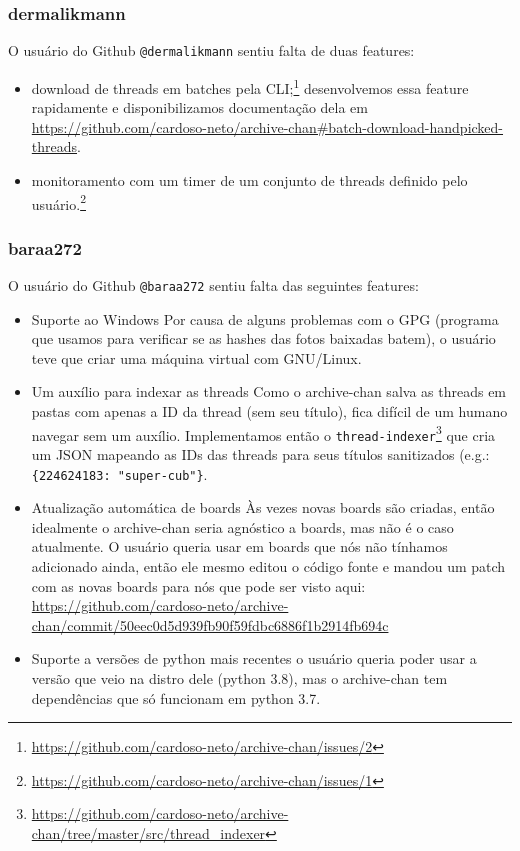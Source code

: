 \subsubsection{dermalikmann}

O usuário do Github \texttt{@dermalikmann} sentiu falta de duas features:

\begin{itemize}
    \item download de threads em batches pela CLI;\footnote{\url{https://github.com/cardoso-neto/archive-chan/issues/2}}
        \subitem desenvolvemos essa feature rapidamente e disponibilizamos documentação dela em \url{https://github.com/cardoso-neto/archive-chan#batch-download-handpicked-threads}.
    \item monitoramento com um timer de um conjunto de threads definido pelo usuário.\footnote{\url{https://github.com/cardoso-neto/archive-chan/issues/1}}
\end{itemize} 

\subsubsection{baraa272}

O usuário do Github \texttt{@baraa272} sentiu falta das seguintes features:

\begin{itemize}
    \item Suporte ao Windows
        \subitem Por causa de alguns problemas com o GPG (programa que usamos para verificar se as hashes das fotos baixadas batem), o usuário teve que criar uma máquina virtual com GNU/Linux.
    \item Um auxílio para indexar as threads
        \subitem Como o archive-chan salva as threads em pastas com apenas a ID da thread (sem seu título), fica difícil de um humano navegar sem um auxílio.
        \subitem Implementamos então o \texttt{thread-indexer}\footnote{\url{https://github.com/cardoso-neto/archive-chan/tree/master/src/thread_indexer}} que cria um JSON mapeando as IDs das threads para seus títulos sanitizados (e.g.: \texttt{\{224624183: "super-cub"\}}.
    \item Atualização automática de boards
        \subitem Às vezes novas boards são criadas, então idealmente o archive-chan seria agnóstico a boards, mas não é o caso atualmente.
        \subitem O usuário queria usar em boards que nós não tínhamos adicionado ainda, então ele mesmo editou o código fonte e mandou um patch com as novas boards para nós que pode ser visto aqui: \url{https://github.com/cardoso-neto/archive-chan/commit/50eec0d5d939fb90f59fdbc6886f1b2914fb694c}
    \item Suporte a versões de python mais recentes
        \subitem o usuário queria poder usar a versão que veio na distro dele (python 3.8), mas o archive-chan tem dependências que só funcionam em python 3.7.
\end{itemize}

